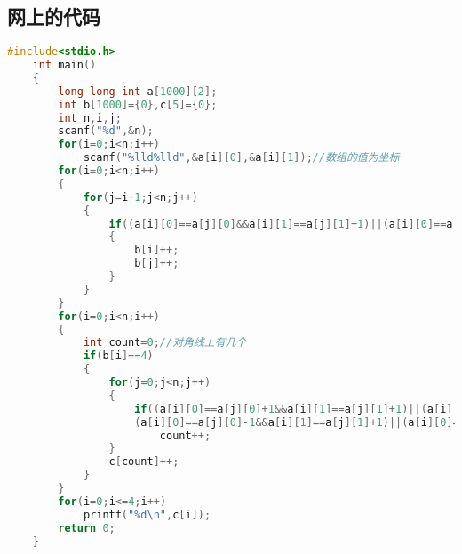 \subsection{网上的代码}
\begin{lstlisting}[language=C++]
    #include<stdio.h>
    int main()
    {
        long long int a[1000][2];
        int b[1000]={0},c[5]={0};
        int n,i,j;
        scanf("%d",&n);
        for(i=0;i<n;i++)
            scanf("%lld%lld",&a[i][0],&a[i][1]);//数组的值为坐标 
        for(i=0;i<n;i++)
        {
            for(j=i+1;j<n;j++)
            {
                if((a[i][0]==a[j][0]&&a[i][1]==a[j][1]+1)||(a[i][0]==a[j][0]&&a[i][1]==a[j][1]-1)||	(a[i][0]==a[j][0]-1&&a[i][1]==a[j][1])||(a[i][0]==a[j][0]+1&&a[i][1]==a[j][1]))
                {
                    b[i]++;
                    b[j]++;
                }
            }
        }
        for(i=0;i<n;i++)
        {
            int count=0;//对角线上有几个 
            if(b[i]==4)
            {
                for(j=0;j<n;j++)
                {
                    if((a[i][0]==a[j][0]+1&&a[i][1]==a[j][1]+1)||(a[i][0]==a[j][0]+1&&a[i][1]==a[j][1]-1)||
                    (a[i][0]==a[j][0]-1&&a[i][1]==a[j][1]+1)||(a[i][0]==a[j][0]-1&&a[i][1]==a[j][1]-1))
                        count++;
                }
                c[count]++;
            } 
        }
        for(i=0;i<=4;i++)
            printf("%d\n",c[i]);
        return 0;
    }    
\end{lstlisting}